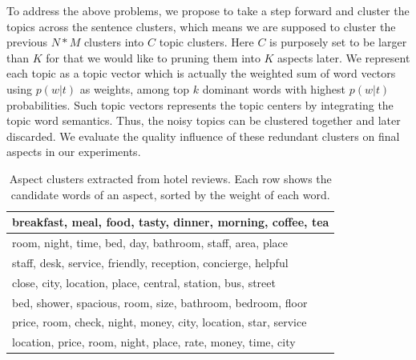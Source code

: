 To address the above problems, we propose to take a step forward and cluster the topics across the sentence clusters, which means we are supposed to cluster the previous $N*M$ clusters into $C$ topic clusters.
Here $C$ is purposely set to be larger than $K$ for that we would like to pruning them into $K$ aspects later.
We represent each topic as a topic vector which is actually the weighted sum of word vectors using $p(w|t)$ as weights, 
among top $k$ dominant words with highest $p(w|t)$ probabilities.
Such topic vectors represents the topic centers by integrating the topic word semantics. 
Thus, the noisy topics can be clustered together and later discarded. 
We evaluate the quality influence of these redundant clusters on 
final aspects in our experiments.

\begin{table}[th]
\caption{Aspect clusters extracted from hotel reviews.
Each row shows the candidate words of an aspect, sorted by the weight of each word.}
\label{table:step3}
\centering
\begin{tabular}{|l|} \hline
breakfast, meal, food, tasty, dinner, morning, coffee, tea \\\hline
room, night, time, bed, day, bathroom, staff, area, place \\\hline
staff, desk, service, friendly, reception, concierge, helpful \\\hline
close, city, location, place, central, station, bus, street\\\hline
bed, shower, spacious, room, size, bathroom, bedroom, floor \\\hline
price, room, check, night, money, city, location, star, service \\\hline
location, price, room, night, place, rate, money, time, city  \\\hline
\end{tabular}
\end{table}


